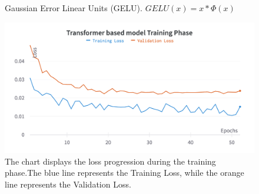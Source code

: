 \begin{figure}[H]
	\centering
	\caption{Gaussian Error Linear Units (GELU). $GELU(x) = x * \Phi(x)$}
	\label{fig:gelu}
\end{figure}

\begin{figure}[H]
	\centering
	\includegraphics[width=.9\textwidth]{chapters/3_models/imgs/gab/gabtraining.png}
	\caption{The chart displays the loss progression during the training phase.The blue line represents the Training Loss, while the orange line represents the Validation Loss.}
	\label{fig:gabtrainchart}
\end{figure}

